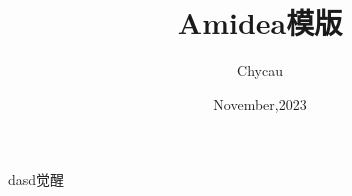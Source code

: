 \documentclass[blue]{amidea}
\title{Amidea模版}
\subtitle{}
\author{Chycau}
\date{November,2023}
\begin{document}
\maketitle

dasd觉醒
\end{document}
